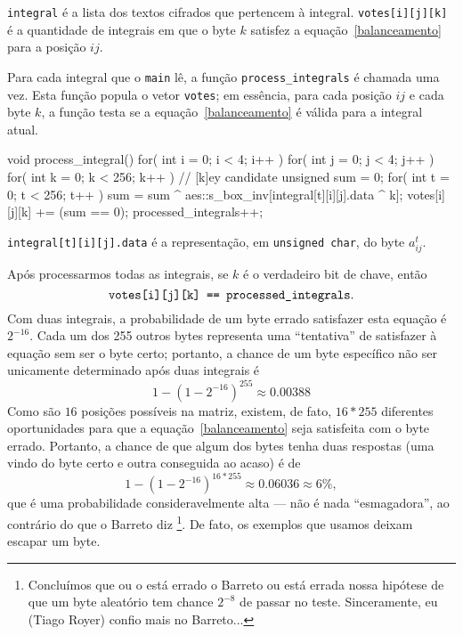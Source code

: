 \documentclass{article}
\begin{document}
\verb"integral" é a lista dos textos cifrados que pertencem à integral.
\verb"votes[i][j][k]" é a quantidade de integrais
em que o byte $k$ satisfez a equação~\ref{balanceamento}
para a posição $ij$.

Para cada integral que o \verb"main" lê,
a função \verb"process_integrals" é chamada uma vez.
Esta função popula o vetor \verb"votes";
em essência, para cada posição $ij$ e cada byte $k$,
a função testa se a equação~\ref{balanceamento} é válida para a integral atual.
\begin{cppcode}
    void process_integral() {
        for( int i = 0; i < 4; i++ )
        for( int j = 0; j < 4; j++ )
        for( int k = 0; k < 256; k++ ) { // [k]ey candidate
            unsigned sum = 0;
            for( int t = 0; t < 256; t++ )
                sum = sum ^ aes::s_box_inv[integral[t][i][j].data ^ k];
            votes[i][j][k] += (sum == 0);
        }
        processed_integrals++;
    }
\end{cppcode}
\verb"integral[t][i][j].data" é a representação,
em \verb"unsigned char",
do byte $a^t_{ij}$.

Após processarmos todas as integrais,
se $k$ é o verdadeiro bit de chave,
então
\begin{equation}
    \label{votos-suficientes}
    \verb"votes[i][j][k] == processed_integrals".
\end{equation}
Com duas integrais,
a probabilidade de um byte errado satisfazer esta equação
é $2^{-16}$.
Cada um dos 255 outros bytes representa uma ``tentativa''
de satisfazer à equação sem ser o byte certo;
portanto,
a chance de um byte específico não ser unicamente determinado
após duas integrais é
\begin{equation*}
    1 - (1 - 2^{-16})^{255} \approx 0.00388
\end{equation*}
Como são $16$ posições possíveis na matriz,
existem, de fato, $16*255$ diferentes oportunidades
para que a equação~\ref{balanceamento} seja satisfeita com o byte errado.
Portanto,
a chance de que algum dos bytes tenha duas respostas
(uma vindo do byte certo e outra conseguida ao acaso)
é de
\begin{equation*}
    1 - (1 - 2^{-16})^{16*255} \approx 0.06036 \approx 6\%,
\end{equation*}
que é uma probabilidade consideravelmente alta
--- não é nada ``esmagadora'', ao contrário do que o Barreto diz%
\footnote{
    Concluímos que ou o está errado o Barreto
    ou está errada nossa hipótese de que
    um byte aleatório tem chance $2^{-8}$ de passar no teste.
    Sinceramente, eu (Tiago Royer) confio mais no Barreto...
}.
De fato, os exemplos que usamos deixam escapar um byte.
\end{document}
